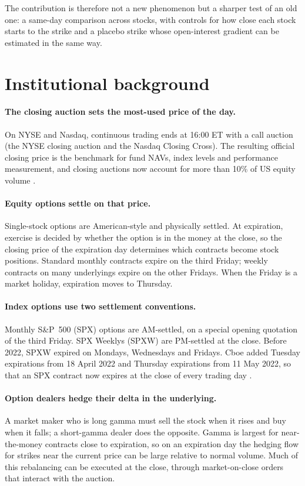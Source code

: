 \documentclass[11pt,a4paper]{article}
\begin{document}
The contribution is therefore not a new phenomenon but a sharper test of an old one: a same-day comparison across stocks, with controls for how close each stock starts to the strike and a placebo strike whose open-interest gradient can be estimated in the same way.

\section{Institutional background}

\paragraph{The closing auction sets the most-used price of the day.} On NYSE and Nasdaq, continuous trading ends at 16:00 ET with a call auction (the NYSE closing auction and the Nasdaq Closing Cross). The resulting official closing price is the benchmark for fund NAVs, index levels and performance measurement, and closing auctions now account for more than 10\% of US equity volume \citep{HuMurphy2026}.

\paragraph{Equity options settle on that price.} Single-stock options are American-style and physically settled. At expiration, exercise is decided by whether the option is in the money at the close, so the closing price of the expiration day determines which contracts become stock positions. Standard monthly contracts expire on the third Friday; weekly contracts on many underlyings expire on the other Fridays. When the Friday is a market holiday, expiration moves to Thursday.

\paragraph{Index options use two settlement conventions.} Monthly S\&P~500 (SPX) options are AM-settled, on a special opening quotation of the third Friday. SPX Weeklys (SPXW) are PM-settled at the close. Before 2022, SPXW expired on Mondays, Wednesdays and Fridays. Cboe added Tuesday expirations from 18 April 2022 and Thursday expirations from 11 May 2022, so that an SPX contract now expires at the close of every trading day \citep{Cboe2022}.

\paragraph{Option dealers hedge their delta in the underlying.} A market maker who is long gamma must sell the stock when it rises and buy when it falls; a short-gamma dealer does the opposite. Gamma is largest for near-the-money contracts close to expiration, so on an expiration day the hedging flow for strikes near the current price can be large relative to normal volume. Much of this rebalancing can be executed at the close, through market-on-close orders that interact with the auction.
\end{document}
